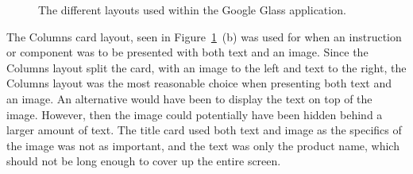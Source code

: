 	\begin{figure}[ht!]
		\centering
   		 \qquad
   		 \qquad
    		\qquad
   		 \qquad
		\caption{The different layouts used within the Google Glass application.}
		\label{fig:cardLayout}
	\end{figure}

The Columns card layout, seen in Figure~\ref{fig:cardLayout}~(b) was used for when an instruction or component was to be presented with both text and an image. Since the Columns layout split the card, with an image to the left and text to the right, the Columns layout was the most reasonable choice when presenting both text and an image. An alternative would have been to display the text on top of the image. However, then the image could potentially have been hidden behind a larger amount of text. The title card used both text and image as the specifics of the image was not as important, and the text was only the product name, which should not be long enough to cover up the entire screen.

